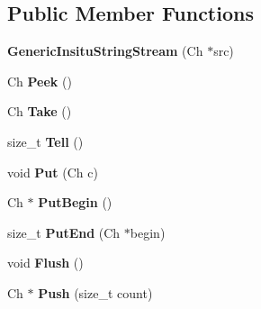 \subsection*{Public Member Functions}
\begin{DoxyCompactItemize}
\item 
{\bfseries Generic\+Insitu\+String\+Stream} (Ch $\ast$src)\hypertarget{struct_generic_insitu_string_stream_ad8b8417f0501ac261c7232023292c183}{}\label{struct_generic_insitu_string_stream_ad8b8417f0501ac261c7232023292c183}

\item 
Ch {\bfseries Peek} ()\hypertarget{struct_generic_insitu_string_stream_ae21ba3ff4595ccd5caa4a9858e793f3f}{}\label{struct_generic_insitu_string_stream_ae21ba3ff4595ccd5caa4a9858e793f3f}

\item 
Ch {\bfseries Take} ()\hypertarget{struct_generic_insitu_string_stream_afde4e46663225e4c32cfdbcd261f321e}{}\label{struct_generic_insitu_string_stream_afde4e46663225e4c32cfdbcd261f321e}

\item 
size\+\_\+t {\bfseries Tell} ()\hypertarget{struct_generic_insitu_string_stream_aa9a84abb24e8c93b683a2e7bfea309db}{}\label{struct_generic_insitu_string_stream_aa9a84abb24e8c93b683a2e7bfea309db}

\item 
void {\bfseries Put} (Ch c)\hypertarget{struct_generic_insitu_string_stream_a74f92f9a4c34bd65aab4b99f519a543a}{}\label{struct_generic_insitu_string_stream_a74f92f9a4c34bd65aab4b99f519a543a}

\item 
Ch $\ast$ {\bfseries Put\+Begin} ()\hypertarget{struct_generic_insitu_string_stream_afc671072f56eb6e8d9009061c6565dd4}{}\label{struct_generic_insitu_string_stream_afc671072f56eb6e8d9009061c6565dd4}

\item 
size\+\_\+t {\bfseries Put\+End} (Ch $\ast$begin)\hypertarget{struct_generic_insitu_string_stream_a93702b08ff29c66bde389b0d4e9efa5a}{}\label{struct_generic_insitu_string_stream_a93702b08ff29c66bde389b0d4e9efa5a}

\item 
void {\bfseries Flush} ()\hypertarget{struct_generic_insitu_string_stream_a53597dc98a03a6a051c37c4f1046bd04}{}\label{struct_generic_insitu_string_stream_a53597dc98a03a6a051c37c4f1046bd04}

\item 
Ch $\ast$ {\bfseries Push} (size\+\_\+t count)\hypertarget{struct_generic_insitu_string_stream_af91a643e5a93292bc0fbda33320caf20}{}\label{struct_generic_insitu_string_stream_af91a643e5a93292bc0fbda33320caf20}


\end{DoxyCompactItemize}
